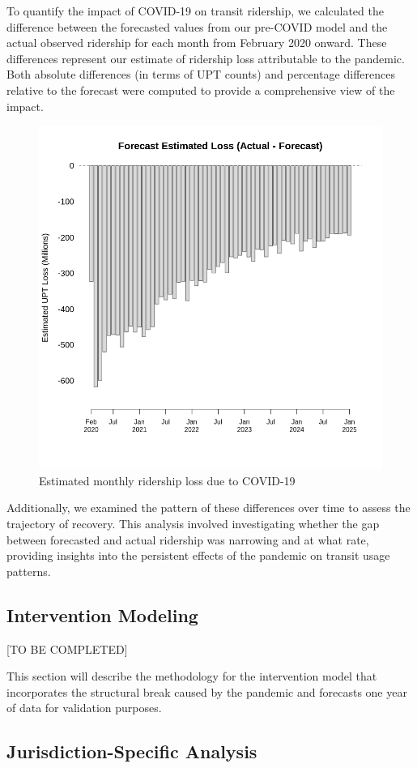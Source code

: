 \documentclass[11pt]{article}
\begin{document}
To quantify the impact of COVID-19 on transit ridership, we calculated the difference between the forecasted values from our pre-COVID model and the actual observed ridership for each month from February 2020 onward. These differences represent our estimate of ridership loss attributable to the pandemic. Both absolute differences (in terms of UPT counts) and percentage differences relative to the forecast were computed to provide a comprehensive view of the impact.

\begin{figure}[!ht]
\centering
\includegraphics[width=0.525\linewidth]{estimated_loss.png}
\caption{Estimated monthly ridership loss due to COVID-19}
\label{f:loss}
\end{figure}

Additionally, we examined the pattern of these differences over time to assess the trajectory of recovery. This analysis involved investigating whether the gap between forecasted and actual ridership was narrowing and at what rate, providing insights into the persistent effects of the pandemic on transit usage patterns.

\subsection{Intervention Modeling}

[TO BE COMPLETED]

This section will describe the methodology for the intervention model that incorporates the structural break caused by the pandemic and forecasts one year of data for validation purposes.

\subsection{Jurisdiction-Specific Analysis}
\end{document}

